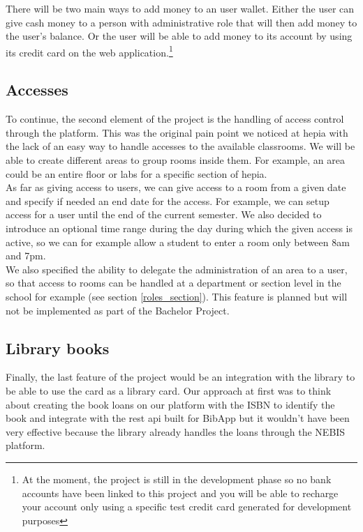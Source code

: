 \documentclass[twoside, openright,11pt,a4paper]{book}
\begin{document}
There will be two main ways to add money to an user wallet. Either the user can give cash money to a person with administrative role that will then add money to the user's balance. Or the user will be able to add money to its account by using its credit card on the web application.\footnote{At the moment, the project is still in the development phase so no bank accounts have been linked to this project and you will be able to recharge your account only using a specific test credit card generated for development purposes}

\subsection{Accesses}

To continue, the second element of the project is the handling of access control through the platform. This was the original pain point we noticed at hepia with the lack of an easy way to handle accesses to the available classrooms. We will be able to create different areas to group rooms inside them. For example, an area could be an entire floor or labs for a specific section of hepia.\\

As far as giving access to users, we can give access to a room from a given date and specify if needed an end date for the access. For example, we can setup access for a user until the end of the current semester. We also decided to introduce an optional time range during the day during which the given access is active, so we can for example allow a student to enter a room only between 8am and 7pm. \\

We also specified the ability to delegate the administration of an area to a user, so that access to rooms can be handled at a department or section level in the school for example (see section \ref{roles_section}). This feature is planned but will not be implemented as part of the Bachelor Project.

\subsection{Library books}
\label{books_feature}
Finally, the last feature of the project would be an integration with the library to be able to use the card as a library card. Our approach at first was to think about creating the book loans on our platform with the ISBN to identify the book and integrate with the \gls{rest} \gls{api} built for BibApp\cite{playstore:bibapp} but it wouldn't have been very effective because the library already handles the loans through the NEBIS platform.\\
\end{document}
